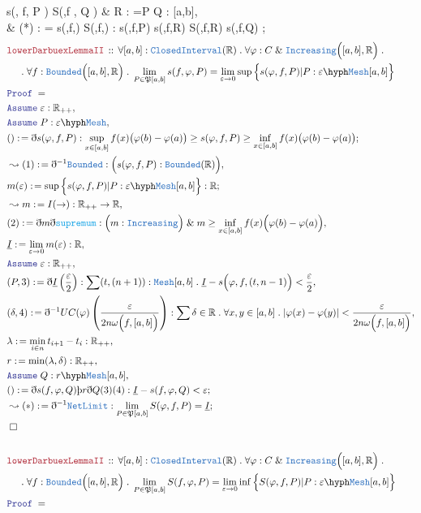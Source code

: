 \documentclass[12pt]{scrartcl}
\newcommand{\TYPE}[1]{\textcolor{NavyBlue}{\mathtt{#1}}}
\newcommand{\FUNC}[1]{\textcolor{Cerulean}{\mathtt{#1}}}
\newcommand{\LOGIC}[1]{\textcolor{Blue}{\mathtt{#1}}}
\newcommand{\THM}[1]{\textcolor{Maroon}{\mathtt{#1}}}
\renewcommand{\.}{\; . \;}
\newcommand{\de}{: \kern 0.1pc =}
\newcommand{\Theorem}[2]{& \THM{#1} \, :: \, #2 \\ & \Proof = \\ }
\newcommand{\NewLine}{\\ & \kern 1pc}
\newcommand{\Page}[1]{ \begin{align*} #1 \end{align*}   }
\newcommand{ \bd }{ \ByDef }
\renewcommand{\And}{\; \& \;}
\newcommand{\Reals}{\mathbb{R} }
\newcommand{\Say}[3]{& #1 \de #2 : #3, \\}
\newcommand{\Conclude}[3]{& #1 \de #2 : #3; \\}
\newcommand{\Derive}[3]{& \leadsto #1 \de #2 : #3, \\}
\newcommand{\DeriveConclude}[3]{& \leadsto #1 \de #2 : #3 ; \\}
\newcommand{\Assume}[2]{& \LOGIC{Assume} \;#1 : #2, \\}
\newcommand{\QED}{\; \square}
\newcommand{\EndProof}{& \QED \\}
\newcommand{\ByDef}{\eth}
\newcommand{\ByConstr}{\text{\thorn}}
\newcommand{\Proof}{\LOGIC{Proof} \; }
\begin{document}
{{		s(\varphi, f, P ) \le S(\varphi,f , Q )
		}
	\Say{R}{P \cap Q}{\TYPE{Mesh}[a,b]}
	\Conclude{(*)}{ \bd s(\varphi,f,\cdot) \bd S(\varphi,f,\cdot)    }
	{  s(\varphi,f,P) \le s(\varphi,f,R) \le S(\varphi,f,R) \le s(\varphi,f,Q)    }
}\Page{
	\Theorem{lowerDarbuexLemmaII}{\forall [a,b] : \TYPE{ClosedInterval}(\Reals) \. 
		\forall \varphi : C \And \TYPE{Increasing}
		\Big( [a,b], \Reals  \Big) \. 
		\NewLine \.
		\forall f : \TYPE{Bounded}\Big( [a,b],\Reals \Big) \.
		\lim_{P \in \mathfrak{P}[a,b]} s(f,\varphi,P) = 
			\lim_{\varepsilon \to 0} \sup \Big\{ s(\varphi,f,P) | P : \varepsilon \hyph \TYPE{Mesh}[a,b] \Big\} 
	}
	\Assume{\varepsilon}{\Reals_{++}}
	\Assume{ P  }{\varepsilon \hyph \TYPE{Mesh}}
	\Conclude{()}{\bd s(\varphi,f, P)}{  \sup_{x \in [a,b]} f(x)\big( \varphi(b) - \varphi(a) \big)
		\ge  s(\varphi,f,P) \ge \inf_{x \in [a,b]} f(x)\big(\varphi(b) - \varphi(a)\big)   }
	\Derive{(1)}{\bd^{-1}\TYPE{Bounded}}{ 
		\Big( s(\varphi,f,P) : \TYPE{Bounded}(\Reals)    \Big)
	}
	\Conclude{m(\varepsilon)}{ \sup \Big\{ s( \varphi,f, P ) | P : \varepsilon \hyph \TYPE{Mesh}[a,b]  \Big\}}{\Reals}
	\Derive{m}{I(\to)}{\Reals_{++} \to \Reals}
	\Say{(2)}{\bd m\bd \FUNC{supremum}}{ \Big( m : \TYPE{Increasing} \Big) \And 
		m \ge \inf_{x \in [a,b]} f(x)\Big( \varphi(b) - \varphi(a)   \Big) }
	\Say{\underline{I}}{\lim_{\varepsilon \to 0} m(\varepsilon)}{\Reals}
	\Assume{\varepsilon}{\Reals_{++}}
	\Say{(P,3)}{ \bd \underline{I}\left( \frac{\varepsilon}{2} \right)}
	{ \sum (t,(n+1)) : \TYPE{Mesh}[a,b] \. \underline{I} - s\Big(\varphi,f, (t,n-1)\Big) < \frac{\varepsilon}{2}  }
	\Say{(\delta,4)}{\bd^{-1} UC(\varphi)\left( \frac{\varepsilon}{2n\omega\Big(f, [a,b] \Big) } \right)}
	{
		\sum \delta \in \Reals \.  \forall x,y \in [a,b] \. 
		| \varphi(x) - \varphi(y)| < \frac{\varepsilon}{2n\omega\Big(f,[a,b]\Big)}
	}
	\Say{\lambda}{\min_{i \in n} t_{i+1} - t_i}{ \Reals_{++}}
	\Say{r}{\min( \lambda, \delta)}{\Reals_{++}}
	\Assume{Q}{r\hyph\TYPE{Mesh}[a,b]}
	\Conclude{()}{\bd s(f,\varphi,Q)\ByConstr r\bd Q (3)(4)}{\underline{I} - s(f,\varphi,Q) < \varepsilon}
	\DeriveConclude{(*)}{\bd^{-1} \TYPE{NetLimit}}
	{ \lim_{P \in \mathfrak{P}[a,b]} S(\varphi,f,P) = \underline{I} }
	\EndProof
	\\
	\Theorem{lowerDarbuexLemmaII}{\forall [a,b] : \TYPE{ClosedInterval}(\Reals) \. 
		\forall \varphi : C \And \TYPE{Increasing}
		\Big( [a,b], \Reals  \Big) \. 
		\NewLine \.
		\forall f : \TYPE{Bounded}\Big( [a,b],\Reals \Big) \.
		\lim_{P \in \mathfrak{P}[a,b]} S(f,\varphi,P) = 
			\lim_{\varepsilon \to 0} \inf \Big\{ S(\varphi,f,P) | P : \varepsilon \hyph \TYPE{Mesh}[a,b] \Big\} 
}}
\end{document}
